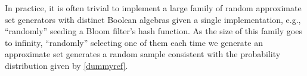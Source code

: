 \documentclass[ ../main.tex]{subfiles}
\begin{document}
In practice, it is often trivial to implement a large family 
of random approximate set
generators with distinct Boolean algebras given a single implementation, e.g.,
``randomly'' seeding a Bloom filter's hash function. As the size of this family
goes to infinity, ``randomly'' selecting one of them each time we generate an 
approximate set generates a random sample consistent with the 
probability distribution given by \cref{dummyref}.   

\end{document}
